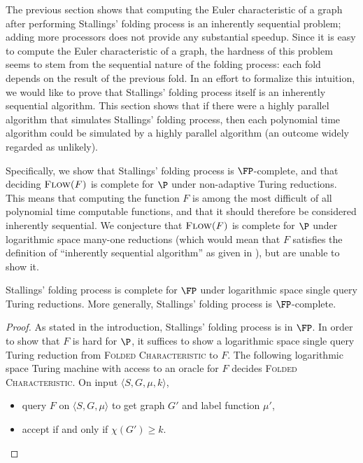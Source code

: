 \documentclass{article}
\newcommand{\FC}{\textsc{Folded Characteristic}}
\newcommand{\Flow}{\textsc{Flow($F$)}}
\begin{document}
The previous section shows that computing the Euler characteristic of a graph after performing Stallings' folding process is an inherently sequential problem; adding more processors does not provide any substantial speedup.
Since it is easy to compute the Euler characteristic of a graph, the hardness of this problem seems to stem from the sequential nature of the folding process: each fold depends on the result of the previous fold.
In an effort to formalize this intuition, we would like to prove that Stallings' folding process itself is an inherently sequential algorithm.
This section shows that if there were a highly parallel algorithm that simulates Stallings' folding process, then each polynomial time algorithm could be simulated by a highly parallel algorithm (an outcome widely regarded as unlikely).

%
Specifically, we show that Stallings' folding process is $\FP$-complete, and that deciding $\Flow$ is complete for $\P$ under non-adaptive Turing reductions.
This means that computing the function $F$ is among the most difficult of all polynomial time computable functions, and that it should therefore be considered inherently sequential.
We conjecture that $\Flow$ is complete for $\P$ under logarithmic space many-one reductions (which would mean that $F$ satisfies the definition of ``inherently sequential algorithm'' as given in \autocite[Definition~8.2.2]{ghr95}), but are unable to show it.

\begin{theorem}\label{thm:fpcomplete}
  Stallings' folding process is complete for $\FP$ under logarithmic space single query Turing reductions.
  More generally, Stallings' folding process is $\FP$-complete.
\end{theorem}
\begin{proof}
  As stated in the introduction, Stallings' folding process is in $\FP$.
  In order to show that $F$ is hard for $\P$, it suffices to show a logarithmic space single query Turing reduction from \FC{} to $F$.
  The following logarithmic space Turing machine with access to an oracle for $F$ decides \FC{}.
  On input $\langle S, G, \mu, k \rangle$,
  \begin{itemize}
  \item query $F$ on $\langle S, G, \mu \rangle$ to get graph $G'$ and label function $\mu'$,
  \item accept if and only if $\chi(G') \geq k$. \qedhere
  \end{itemize}
\end{proof}
\end{document}
